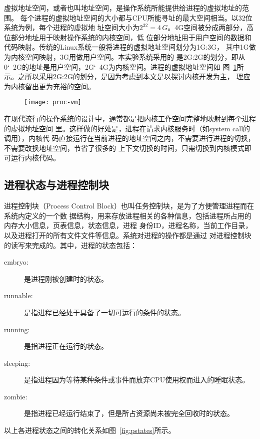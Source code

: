 \documentclass{swfcthesismscctex}
\begin{document}
虚拟地址空间，或者也叫地址空间，是操作系统所能提供给进程的虚拟地址的范围\cite{zos}。
每个进程的虚拟地址空间的大小都与CPU所能寻址的最大空间相当。以32位系统为例，每个进程的虚拟地
址空间大小为$2^{32}=4\,G$。4G空间被分成两部分，高位部分地址用于映射操作系统的内核空间，低
位部分地址用于用户空间的数据和代码映射。传统的Linux系统一般将进程的虚拟地址空间划分为1G:3G，
其中1G做为内核空间映射，3G用做用户空间\cite{silberschatz11essentials}。本实验系统采用的
是2G:2G的划分，即从0\char`~2G的地址是用户空间，2G\char`~4G为内核空间。进程的虚拟地址空间如
图~\ref{fig:process-vm}所示。之所以采用2G:2G的划分，是因为考虑到本文是以探讨内核开发为主，
理应为内核留出更为充裕的空间。

\begin{figure}[!htb]
  \centering \texttt{[image: proc-vm]}
  \label{fig:process-vm}
\end{figure}
 
在现代流行的操作系统的设计中，通常都是把内核工作空间完整地映射到每个进程的虚拟地址空间
里\cite{love2010linux}。这样做的好处是，进程在请求内核服务时（如system call的调用），内核代
码直接运行在当前进程的地址空间之内，不需要进行进程的切换，不需要改换地址空间，节省了很多的
上下文切换的时间，只需切换到内核模式即可运行内核代码。

\subsection{进程状态与进程控制块}
\label{sec:proc}

进程控制块（Process Control Block）也叫任务控制块，是为了方便管理进程而在系统内定义的一个数
据结构，用来存放进程相关的各种信息，包括进程所占用的内存大小信息，页表信息，状态信息，进程
身份ID，进程名称，当前工作目录，以及进程打开的所有文件文件等信息。系统对进程的操作都是通过
对进程控制块的读写来完成的\cite{silberschatz10java}。其中，进程的状态包括：

\begin{description}
\item[embryo:] 是进程刚被创建时的状态。
\item[runnable:] 是指进程已经处于具备了一切可运行的条件的状态。
\item[running:] 是指进程正在运行的状态。
\item[sleeping:] 是指进程因为等待某种条件或事件而放弃CPU使用权而进入的睡眠状态。
\item[zombie:] 是指进程已经运行结束了，但是所占资源尚未被完全回收时的状态。
\end{description}
以上各进程状态之间的转化关系如图~\ref{fig:pstates}所示。
\end{document}
